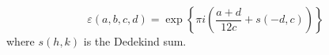 $$\varepsilon(a, b, c, d) = \exp\!\left\{ \pi i \left( \frac{a + d}{12c} + s(-d, c) \right) \right\}$$
where $s(h,k)$ is the Dedekind sum.
